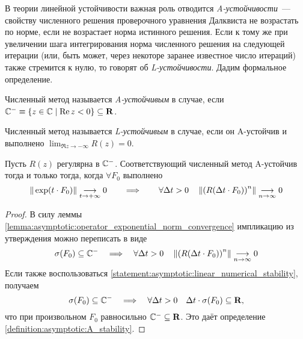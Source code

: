 В теории линейной устойчивости важная роль отводится \emph{A-устойчивости}~--- свойству численного решения проверочного уравнения Далквиста не возрастать по норме,
если не возрастает норма истинного решения.
Если к тому же при увеличении шага интегрирования норма численного решения на следующей итерации (или, быть может, через некоторе заранее известное число итераций)
также стремится к нулю, то говорят об \emph{L-устойчивости}.
Дадим формальное определение.

\begin{definition}
    \label{definition:asymptotic:A_stability}
    Численный метод называется \emph{A-устойчивым} в случае,
    если $ \mathbb{C}^- \equiv \{ z \in \mathbb{C} \mid \operatorname{Re} z < 0 \} \subseteq \mathbf{R} $.
\end{definition}

\begin{definition}
    \label{definition:asymptotic:L_stability}
    Численный метод называется \emph{L-устойчивым} в случае,
    если он A-устойчив и выполнено $ \displaystyle\lim_{\Re z \to -\infty} R(z) = 0 $.
\end{definition}

\begin{statement}
    \label{statement:asymptotic:A_stability_criterion}
    Пусть $ R(z) $ регулярна в $ \mathbb{C}^- $.
    Соответствующий численный метод A-устойчив тогда и только тогда, когда $ \forall F_0 $ выполнено
    \[
        \| \exp(t \cdot F_0) \| \underset{t \to +\infty}{\longrightarrow} 0 \qquad \Longrightarrow \qquad \forall \Delta t > 0 \quad \left \| \left( R(\Delta t \cdot F_0) \right)^n \right\| \underset{n \to \infty}{\longrightarrow} 0
    \]
\end{statement}

\begin{proof}
    В силу леммы \ref{lemma:asymptotic:operator_exponential_norm_convergence} импликацию из утверждения можно переписать в виде
    \[
        \sigma(F_0) \subseteq \mathbb{C}^- \quad \Longrightarrow \quad \forall \Delta t > 0 \quad \left \| \left( R(\Delta t \cdot F_0) \right)^n \right\| \underset{n \to \infty}{\longrightarrow} 0
    \]
    Если также воспользоваться \ref{statement:asymptotic:linear_numerical_stability}, получаем
    \[
        \sigma(F_0) \subseteq \mathbb{C}^- \quad \Longrightarrow \quad \forall \Delta t > 0 \quad \Delta t \cdot \sigma(F_0) \subseteq \mathbf{R},
    \]
    что при произвольном $ F_0 $ равносильно $ \mathbb{C}^- \subseteq \mathbf{R} $.
    Это даёт определение \ref{definition:asymptotic:A_stability}.
\end{proof}

